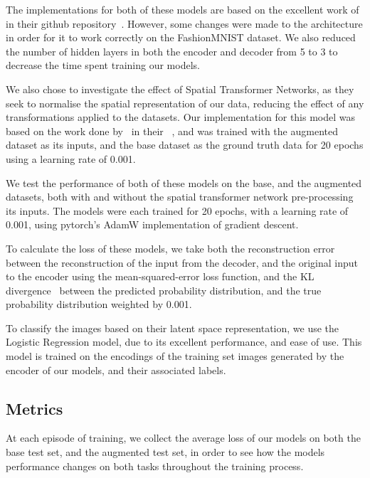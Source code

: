\documentclass[twocolumn]{article}
\begin{document}
The implementations for both of these models are based on the excellent work of~\citeauthor{subramanian2020} in their  github repository~\cite{subramanian2020}. However, some changes were made to the architecture in order for it to work correctly on the FashionMNIST dataset. We also reduced the number of hidden layers in both the encoder and decoder from 5 to 3 to decrease the time spent training our models. 

We also chose to investigate the effect of Spatial Transformer Networks, as they seek to normalise the spatial representation of our data, reducing the effect of any transformations applied to the datasets. Our implementation for this model was based on the work done by~\citeauthor{ghassen2017tutorial} in their ~\cite{ghassen2017tutorial}, and was trained with the augmented dataset as its inputs, and the base dataset as the ground truth data for 20 epochs using a learning rate of 0.001. 

We test the performance of both of these models on the base, and the augmented datasets, both with and without the spatial transformer network pre-processing its inputs. The models were each trained for 20 epochs, with a learning rate of 0.001, using pytorch's AdamW implementation of gradient descent. 

To calculate the loss of these models, we take both the reconstruction error between the reconstruction of the input from the decoder, and the original input to the encoder using the mean-squared-error loss function, and the KL divergence~\cite{kullback1951information} between the predicted probability distribution, and the true probability distribution weighted by 0.001. 

To classify the images based on their latent space representation, we use the Logistic Regression model, due to its excellent performance, and ease of use. This model is trained on the encodings of the training set images generated by the encoder of our models, and their associated labels. 

\subsection{Metrics}

At each episode of training, we collect the average loss of our models on both the base test set, and the augmented test set, in order to see how the models performance changes on both tasks throughout the training process. 
\end{document}

